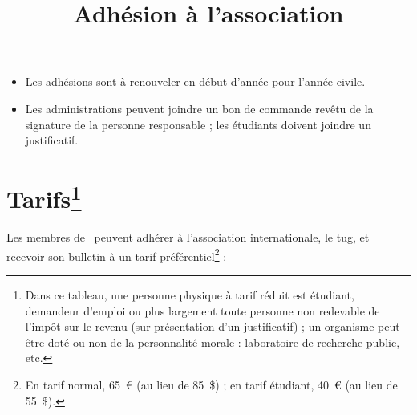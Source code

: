 \title{Adhésion à l'association}
\label{letgut_label_adhesions}
\scriptsize%
\begin{itemize}
\item %
  Les adhésions sont à renouveler  en début d'année
  pour l'année civile.
\item Les administrations peuvent joindre un bon de commande
  revêtu de la signature de la personne responsable ;
  les étudiants doivent joindre un justificatif.
\end{itemize}

\section[Tarifs \the\year]{Tarifs\footnote{Dans ce tableau, une personne
  physique à tarif réduit est étudiant, demandeur d’emploi ou plus largement
  toute personne non redevable de l’impôt sur le revenu (sur présentation d’un
  justificatif) ; un organisme peut être doté ou non de la personnalité
  morale : laboratoire de recherche public, etc.} \the\year}

Les membres de \gut\ peuvent adhérer à l'association internationale, le
\acf{tug}, et recevoir son bulletin \tugboat{} à un tarif
préférentiel\footnote{En tarif normal, 65~€ (au lieu de 85~\$) ; en tarif
  étudiant, 40~€ (au lieu de 55~\$).} :

